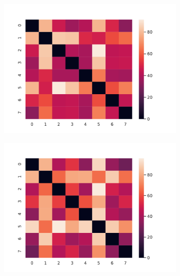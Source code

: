 \documentclass[10pt]{beamer}
\begin{document}
\begin{frame}[fragile]{}

\begin{figure}[ht]
  \centering
  \begin{subfigure}{.32 \linewidth}
    \includegraphics[scale=0.2]{persistence_diagrams/distances/heatmaps/bottleneck_h0.npy.pdf}
  \end{subfigure}%
  \begin{subfigure}{.32 \linewidth}
    \includegraphics[scale=0.2]{persistence_diagrams/distances/heatmaps/bottleneck_h1.npy.pdf}
  \end{subfigure}%
  \begin{subfigure}{.32 \linewidth}

\end{subfigure}
\end{figure}
\end{frame}
\end{document}
